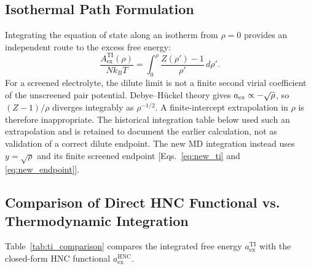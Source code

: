 \documentclass[11pt,a4paper]{article}
\begin{document}
\subsection{Isothermal Path Formulation}

Integrating the equation of state along an isotherm from $\rho = 0$ provides an independent route to the excess free energy:
\begin{equation}
\label{eq:ti_integral}
\frac{A_{\text{ex}}^{\text{TI}}(\rho)}{N k_B T} = \int_0^{\rho} \frac{Z(\rho') - 1}{\rho'} \, d\rho'.
\end{equation}
For a screened electrolyte, the dilute limit is not a finite second virial coefficient of the unscreened pair potential. Debye--H\"uckel theory gives $a_{\rm ex}\propto-\sqrt{\rho}$, so $(Z-1)/\rho$ diverges integrably as $\rho^{-1/2}$. A finite-intercept extrapolation in $\rho$ is therefore inappropriate. The historical integration table below used such an extrapolation and is retained to document the earlier calculation, not as validation of a correct dilute endpoint. The new MD integration instead uses $y=\sqrt{\rho}$ and its finite screened endpoint [Eqs.~\eqref{eq:new_ti} and \eqref{eq:new_endpoint}].

\subsection{Comparison of Direct HNC Functional vs. Thermodynamic Integration}

Table~\ref{tab:ti_comparison} compares the integrated free energy $a_{\text{ex}}^{\text{TI}}$ with the closed-form HNC functional $a_{\text{ex}}^{\text{HNC}}$.
\end{document}
